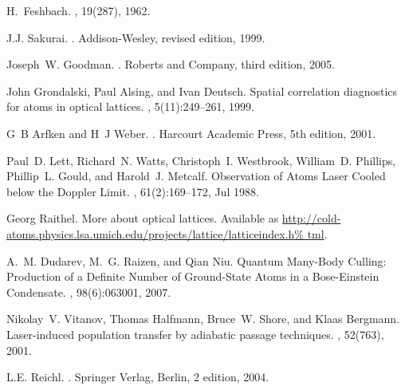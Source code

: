 \documentclass{article}
\begin{document}
\begin{thebibliography}{10}
H.~Feshbach.
, 19(287), 1962.

J.J. Sakurai.
.
\newblock Addison-Wesley, revised edition, 1999.

Joseph~W. Goodman.
.
\newblock Roberts and Company, third edition, 2005.

John Grondalski, Paul Alsing, and Ivan Deutsch.
\newblock Spatial correlation diagnostics for atoms in optical lattices.
, 5(11):249--261, 1999.

G~B Arfken and H~J Weber.
.
\newblock Harcourt Academic Press, 5th edition, 2001.

Paul~D. Lett, Richard~N. Watts, Christoph~I. Westbrook, William~D. Phillips,
  Phillip~L. Gould, and Harold~J. Metcalf.
\newblock Observation of {A}toms {L}aser {C}ooled below the {D}oppler {L}imit.
, 61(2):169--172, Jul 1988.

Georg Raithel.
\newblock More about optical lattices.
\newblock Available as
  \url{http://cold-atoms.physics.lsa.umich.edu/projects/lattice/latticeindex.h%
tml}.

A.~M. Dudarev, M.~G. Raizen, and Qian Niu.
\newblock Quantum {M}any-{B}ody {C}ulling: {P}roduction of a {D}efinite
  {N}umber of {G}round-{S}tate {A}toms in a {B}ose-{E}instein {C}ondensate.
, 98(6):063001, 2007.

Nikolay~V. Vitanov, Thomas Halfmann, Bruce~W. Shore, and Klaas Bergmann.
\newblock Laser-induced population transfer by adiabatic passage techniques.
, 52(763), 2001.

L.E. Reichl.
.
\newblock Springer {V}erlag, Berlin, 2 edition, 2004.

\end{thebibliography}
\end{document}
